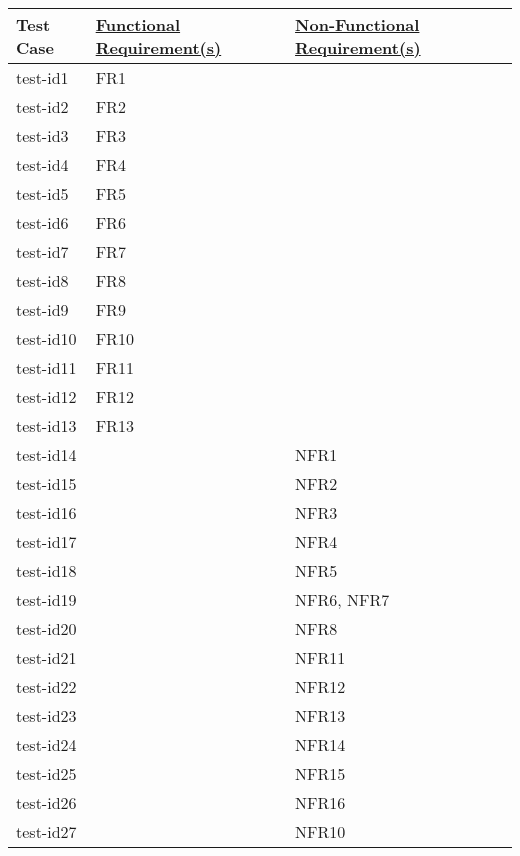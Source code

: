 \documentclass[12pt, titlepage]{article}
\begin{document}
\begin{minipage}{\textwidth}
\footnotesize
{}
\renewcommand*{\arraystretch}{1.5}
\begin{tabular}{| p{} | p{} | p{} |}
 \hline
 Test Case & \href{https://github.com/NevoAbigail/Capstone/blob/main/docs/SRS/SRS.pdf}{Functional Requirement(s)} & \href{https://github.com/NevoAbigail/Capstone/blob/main/docs/SRS/SRS.pdf}{Non-Functional Requirement(s)} \\ 
 \hline
 test-id1 & FR1 &  \\ 
  \hline
 test-id2 & FR2 &  \\
  \hline
 test-id3 & FR3 &  \\  
  \hline
 test-id4 & FR4 &  \\ 
  \hline
 test-id5 & FR5 &  \\ 
  \hline
 test-id6 & FR6 &  \\ 
  \hline
 test-id7 & FR7 &  \\ 
  \hline
 test-id8 & FR8 &  \\ 
  \hline
 test-id9 & FR9 &  \\ 
  \hline
 test-id10 & FR10 &  \\ 
  \hline
 test-id11 & FR11 & \\ 
  \hline
 test-id12 & FR12 &  \\ 
  \hline
 test-id13 & FR13 &  \\ 
 \hline
 test-id14 & & NFR1 \\
 \hline
  test-id15 & & NFR2 \\
 \hline
  test-id16 & & NFR3 \\
 \hline
  test-id17 & & NFR4 \\
 \hline
  test-id18 & & NFR5 \\
 \hline
  test-id19 & & NFR6, NFR7 \\
 \hline
  test-id20 & & NFR8 \\
 \hline
  test-id21 & & NFR11 \\
 \hline
  test-id22 & & NFR12 \\
 \hline
  test-id23 & & NFR13 \\
 \hline
  test-id24 & & NFR14 \\
 \hline
  test-id25 & & NFR15 \\
 \hline
  test-id26 & & NFR16 \\
 \hline
 test-id27 & & NFR10 \\
 \hline
 \end{tabular}
\end{minipage}\\
\end{document}
